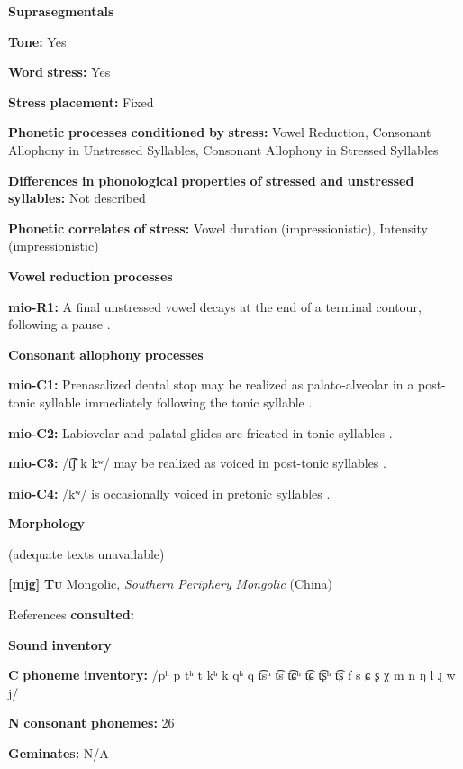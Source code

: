 \textbf{Suprasegmentals}

\textbf{Tone:} Yes

\textbf{Word} \textbf{stress:} Yes

\textbf{Stress} \textbf{placement:} Fixed

\textbf{Phonetic} \textbf{processes} \textbf{conditioned} \textbf{by} \textbf{stress:} Vowel Reduction, Consonant Allophony in Unstressed Syllables, Consonant Allophony in Stressed Syllables

\textbf{Differences} \textbf{in} \textbf{phonological} \textbf{properties} \textbf{of} \textbf{stressed} \textbf{and} \textbf{unstressed} \textbf{syllables:} Not described

\textbf{Phonetic} \textbf{correlates} \textbf{of} \textbf{stress:} Vowel duration (impressionistic), Intensity (impressionistic)

\textbf{Vowel} \textbf{reduction} \textbf{processes}

\textbf{mio-R1:} A final unstressed vowel decays at the end of a terminal contour, following a pause \citep[13]{Bradley1970}.

\textbf{Consonant} \textbf{allophony} \textbf{processes}

\textbf{mio-C1:} Prenasalized dental stop may be realized as palato-alveolar in a post-tonic syllable immediately following the tonic syllable \citep[6]{Bradley1970}.

\textbf{mio-C2:} Labiovelar and palatal glides are fricated in tonic syllables \citep[8]{Bradley1970}.

\textbf{mio-C3:} /t͡ʃ k kʷ/ may be realized as voiced in post-tonic syllables \citep[5]{Bradley1970}.

\textbf{mio-C4:} /kʷ/ is occasionally voiced in pretonic syllables \citep[5]{Bradley1970}.

\textbf{Morphology}

(adequate texts unavailable)

\textbf{[mjg]}   \textbf{\textsc{Tu}}    Mongolic, \textit{Southern} \textit{Periphery} \textit{Mongolic} (China)

References \textbf{consulted:} \citet{Slater2003}

\textbf{Sound} \textbf{inventory}

\textbf{C} \textbf{phoneme} \textbf{inventory:} /pʰ p tʰ t kʰ k qʰ q t͡sʰ t͡s t͡ɕʰ t͡ɕ t͡ʂʰ t͡ʂ f s ɕ ʂ χ m n ŋ l ɻ w j/

\textbf{N} \textbf{consonant} \textbf{phonemes:} 26

\textbf{Geminates:} N/A

